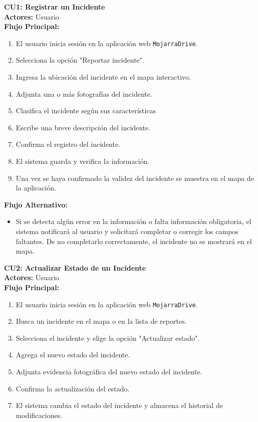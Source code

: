 
\textbf{\large CU1: Registrar un Incidente} \\

\textbf{Actores:} Usuario \\

\textbf{Flujo Principal:}
\begin{enumerate}
    \item El usuario inicia sesión en la aplicación web \texttt{MojarraDrive}.
    \item Selecciona la opción "Reportar incidente".
    \item Ingresa la ubicación del incidente en el mapa interactivo.
    \item Adjunta una o más fotografías del incidente.
    \item Clasifica el incidente según sus características
    \item Escribe una breve descripción del incidente.
    \item Confirma el registro del incidente.
    \item El sistema guarda y verifica la información.
    \item Una vez se haya confirmado la validez del incidente se muestra en el mapa de la aplicación.
\end{enumerate}

\textbf{Flujo Alternativo:}
\begin{itemize}
    \item Si se detecta algún error en la información o falta información obligatoria, el sistema notificará al usuario y solicitará completar o corregir los campos faltantes. De no completarlo correctamente, el incidente no se mostrará en el mapa. 
\end{itemize}

\vspace{0.5cm}

\textbf{\large CU2: Actualizar Estado de un Incidente} \\

\textbf{Actores:} Usuario \\

\textbf{Flujo Principal:}
\begin{enumerate}
    \item El usuario inicia sesión en la aplicación web \texttt{MojarraDrive}.
    \item Busca un incidente en el mapa o en la lista de reportes.
    \item Selecciona el incidente y elige la opción "Actualizar estado".
    \item Agrega el nuevo estado del incidente.
    \item Adjunta evidencia fotográfica del nuevo estado del incidente.
    \item Confirma la actualización del estado.
    \item El sistema cambia el estado del incidente y almacena el historial de modificaciones.
\end{enumerate}

